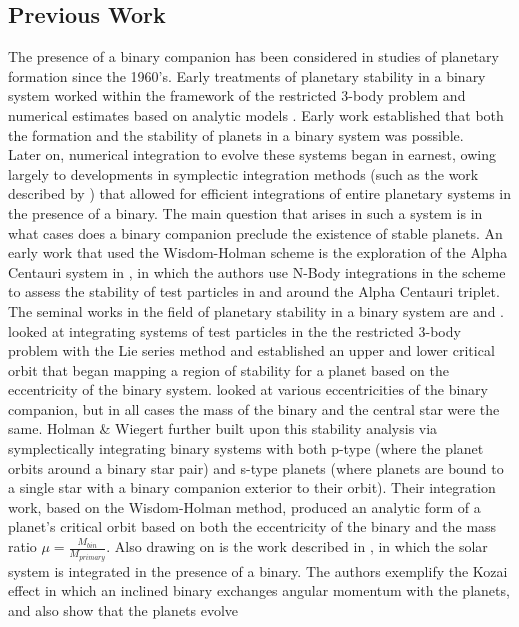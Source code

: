 \documentclass{aastex631}
\begin{document}
\subsection{Previous Work}
\indent The presence of a binary companion has been considered in studies of planetary formation since the 1960's. Early treatments of planetary stability in a binary system worked
within the framework of the restricted 3-body problem \citep{hua60} and numerical estimates based on analytic models \citep{hep78}. Early work established that 
both the formation and the stability of planets in a binary system was possible.\\
Later on, numerical integration to evolve these systems began in earnest, owing largely to developments in symplectic integration methods (such as the work described 
by \cite{wis91}) that 
allowed for efficient integrations of entire planetary systems in the presence of a binary. The main question that arises in such a system is in what cases does a binary 
companion preclude the existence of stable planets. An early work that used the Wisdom-Holman scheme is the exploration of the Alpha Centauri system in \cite{wie97},
in which the authors use N-Body integrations in the \cite{wis91} scheme to assess the stability of test particles in and around the Alpha Centauri triplet. \\
\indent The seminal works in the field of planetary stability in a binary system are \cite{dvo86} and \cite{hol99}. \cite{dvo86} looked at integrating systems of test
particles in the
the restricted 3-body problem with the Lie series method \citep{del85} and established an upper and lower critical orbit that began mapping a region of stability 
for a planet based on the eccentricity of the binary system. \cite{dvo86} looked at various eccentricities of the binary companion, but in all cases the mass of the binary and 
the central star were the same. 
 Holman \& Wiegert further built upon this stability analysis via symplectically integrating binary systems 
with both p-type (where the planet orbits around a binary star pair) and s-type planets (where planets are bound to a single star with a binary companion exterior to their orbit).
 Their integration work, based on the Wisdom-Holman method, produced an analytic form of a planet's critical orbit based on both the eccentricity of the binary and the mass
ratio $\mu = \frac{M_{bin}}{M_{primary}}$. Also drawing on \cite{wis91} is the work described in \cite{ina97}, in which the solar system is integrated in the presence of a 
binary. The authors exemplify the Kozai effect \citep{koz62} in which an inclined binary exchanges angular momentum with the planets, and also show that the planets evolve 
\end{document}
